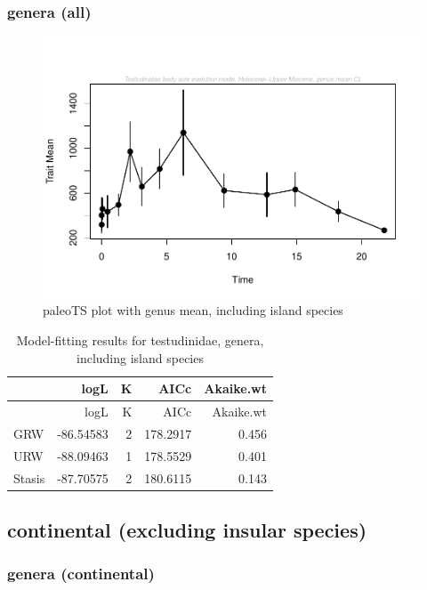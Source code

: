 \documentclass[]{article}
\begin{document}
\subsubsection{genera (all)}\label{genera-all}

\begin{figure}[htbp]
\centering
\includegraphics{MA_JJ_files/figure-latex/paleoTS plot with genus mean, including island species-1.pdf}
\caption{paleoTS plot with genus mean, including island species}
\end{figure}

\begin{longtable}[]{@{}lrrrr@{}}
\caption{Model-fitting results for testudinidae, genera, including
island species}\tabularnewline
\toprule
& logL & K & AICc & Akaike.wt\tabularnewline
\midrule
\endfirsthead
\toprule
& logL & K & AICc & Akaike.wt\tabularnewline
\midrule
\endhead
GRW & -86.54583 & 2 & 178.2917 & 0.456\tabularnewline
URW & -88.09463 & 1 & 178.5529 & 0.401\tabularnewline
Stasis & -87.70575 & 2 & 180.6115 & 0.143\tabularnewline
\bottomrule
\end{longtable}

\newpage

\subsection{continental (excluding insular
species)}\label{continental-excluding-insular-species}

\subsubsection{genera (continental)}\label{genera-continental}
\end{document}
